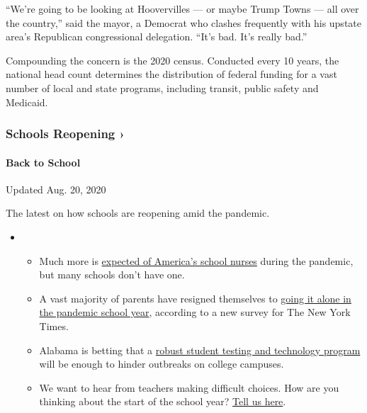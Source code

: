 ``We're going to be looking at Hoovervilles --- or maybe Trump Towns ---
all over the country,'' said the mayor, a Democrat who clashes
frequently with his upstate area's Republican congressional delegation.
``It's bad. It's really bad.''

Compounding the concern is the 2020 census. Conducted every 10 years,
the national head count determines the distribution of federal funding
for a vast number of local and state programs, including transit, public
safety and Medicaid.

\href{https://www.nytimes3xbfgragh.onion/spotlight/schools-reopening?action=click\&pgtype=Article\&state=default\&region=MAIN_CONTENT_3\&context=storylines_keepup}{}

\hypertarget{schools-reopening-}{%
\subsubsection{Schools Reopening ›}\label{schools-reopening-}}

\hypertarget{back-to-school}{%
\paragraph{Back to School}\label{back-to-school}}

Updated Aug. 20, 2020

The latest on how schools are reopening amid the pandemic.

\begin{itemize}
\item
  \begin{itemize}
  \tightlist
  \item
    Much more is
    \href{https://www.nytimes3xbfgragh.onion/2020/08/20/us/schools-reopening-nurses-covid.html?action=click\&pgtype=Article\&state=default\&region=MAIN_CONTENT_3\&context=storylines_keepup}{expected
    of America's school nurses} during the pandemic, but many schools
    don't have one.
  \item
    A vast majority of parents have resigned themselves to
    \href{https://www.nytimes3xbfgragh.onion/2020/08/19/us/colleges-closing-covid.html?action=click\&pgtype=Article\&state=default\&region=MAIN_CONTENT_3\&context=storylines_keepup}{going
    it alone in the pandemic school year}, according to a new survey for
    The New York Times.
  \item
    Alabama is betting that a
    \href{https://www.nytimes3xbfgragh.onion/2020/08/19/business/alabama-uab-coronavirus-tests.html?action=click\&pgtype=Article\&state=default\&region=MAIN_CONTENT_3\&context=storylines_keepup}{robust
    student testing and technology program} will be enough to hinder
    outbreaks on college campuses.
  \item
    We want to hear from teachers making difficult choices. How are you
    thinking about the start of the school year?
    \href{https://www.nytimes3xbfgragh.onion/2020/08/19/us/teachers-school-reopenings.html?action=click\&pgtype=Article\&state=default\&region=MAIN_CONTENT_3\&context=storylines_keepup}{Tell
    us here}.
  \end{itemize}
\end{itemize}

